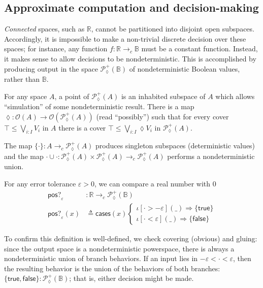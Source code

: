 \documentclass[conference]{IEEEtran}
\newcommand{\PLower}{\mathcal{P}_\lozenge}
\newcommand{\cto}{\to_c}
\newcommand{\R}{\mathbb{R}}
\newcommand{\Open}[1]{\mathcal{O}({#1})}
\newcommand{\bool}{\mathbb{B}}
\newcommand{\wildcard}{\_}
\newcommand{\oinclf}[1]{\iota[{#1}]}
\newcommand{\oincl}[2]{\oinclf{#1} \left({#2}\right)}
\newcommand{\Branch}{\Rightarrow}
\begin{document}
\subsection{Approximate computation and decision-making}

\emph{Connected} spaces, such as $\R$, cannot be partitioned into disjoint open subspaces. Accordingly, it is impossible to make a non-trivial discrete decision over these spaces; for instance, any function $f : \R \cto \bool$ must be a constant function. Instead, it makes sense to allow decisions to be nondeterministic. This is accomplished by producing output in the space $\PLower^+(\bool)$ of nondeterministic Boolean values, rather than $\bool$.

For any space $A$, a point of $\PLower^+(A)$ is an inhabited subspace of $A$ which allows ``simulation'' of some nondeterministic result. There is a map $\lozenge : \Open{A} \to \Open{\PLower^+(A)}$ (read ``possibly'') such that for every cover $\top \le \bigvee_{i : I} V_i$ in $A$ there is a cover $\top \le \bigvee_{i : I} \lozenge V_i$ in $\PLower^+(A)$. 

The map $\{ \cdot \} : A \cto \PLower^+(A)$ produces singleton subspaces (deterministic values) and the map $\cdot \cup \cdot : \PLower^+(A) \times \PLower^+(A) \cto \PLower^+(A)$ performs a nondeterministic union.

For any error tolerance $\varepsilon > 0$, we can compare a real number with 0
\begin{align*}
\mathsf{pos?}_\varepsilon &: \R \cto \PLower^+(\bool)
\\ \mathsf{pos?}_\varepsilon(x) &\triangleq \mathsf{cases}(x)
\begin{cases}
\oincl{\cdot > - \varepsilon}{\wildcard} \Branch \{ \mathsf{true} \}
\\ \oincl{\cdot < \varepsilon}{\wildcard} \Branch \{ \mathsf{false} \}
\end{cases}
\end{align*}

To confirm this definition is well-defined, we check covering (obvious) and gluing: since the output space is a nondeterministic powerspace, there is always a nondeterministic union of branch behaviors. If an input lies in $- \varepsilon < \cdot < \varepsilon$, then the resulting behavior is the union of the behaviors of both branches: $\{ \mathsf{true}, \mathsf{false} \} : \PLower^+(\bool)$; that is, either decision might be made.
\end{document}
